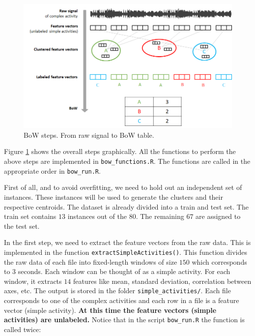 \documentclass[
  11pt,
]{krantz}
\begin{document}
\begin{figure}

{\centering \includegraphics[width=1\linewidth]{images/bow_process} 

}

\caption{BoW steps. From raw signal to BoW table.}\label{fig:bowProcess}
\end{figure}

Figure \ref{fig:bowProcess} shows the overall steps graphically. All the functions to perform the above steps are implemented in \texttt{bow\_functions.R}. The functions are called in the appropriate order in \texttt{bow\_run.R}.

First of all, and to avoid overfitting, we need to hold out an independent set of instances. These instances will be used to generate the clusters and their respective centroids. The dataset is already divided into a train and test set. The train set contains \(13\) instances out of the \(80\). The remaining \(67\) are assigned to the test set.

In the first step, we need to extract the feature vectors from the raw data. This is implemented in the function \texttt{extractSimpleActivities()}. This function divides the raw data of each file into fixed-length windows of size \(150\) which corresponds to \(3\) seconds. Each window can be thought of as a simple activity. For each window, it extracts \(14\) features like mean, standard deviation, correlation between axes, etc. The output is stored in the folder \texttt{simple\_activities/}. Each file corresponds to one of the complex activities and each row in a file is a feature vector (simple activity). \textbf{At this time the feature vectors (simple activities) are unlabeled.} Notice that in the script \texttt{bow\_run.R} the function is called twice:
\end{document}
